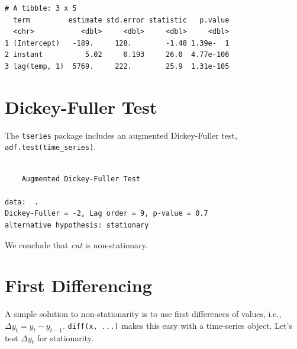 \documentclass[]{book}
\newenvironment{Shaded}{\begin{snugshade}}{\end{snugshade}}
\newcommand{\CommentTok}[1]{\textcolor[rgb]{0.56,0.35,0.01}{\textit{#1}}}
\newcommand{\KeywordTok}[1]{\textcolor[rgb]{0.13,0.29,0.53}{\textbf{#1}}}
\newcommand{\NormalTok}[1]{#1}
\newcommand{\OperatorTok}[1]{\textcolor[rgb]{0.81,0.36,0.00}{\textbf{#1}}}
\newcommand{\StringTok}[1]{\textcolor[rgb]{0.31,0.60,0.02}{#1}}
\begin{document}
\begin{verbatim}
# A tibble: 3 x 5
  term         estimate std.error statistic   p.value
  <chr>           <dbl>     <dbl>     <dbl>     <dbl>
1 (Intercept)   -189.     128.        -1.48 1.39e-  1
2 instant          5.02     0.193     26.0  4.77e-106
3 lag(temp, 1)  5769.     222.        25.9  1.31e-105
\end{verbatim}

\hypertarget{dickey-fuller-test}{%
\section{Dickey-Fuller Test}\label{dickey-fuller-test}}

The \texttt{tseries} package includes an augmented Dickey-Fuller test, \texttt{adf.test(time\_series)}.

\begin{Shaded}
\end{Shaded}

\begin{verbatim}

    Augmented Dickey-Fuller Test

data:  .
Dickey-Fuller = -2, Lag order = 9, p-value = 0.7
alternative hypothesis: stationary
\end{verbatim}

We conclude that \emph{cnt} is non-stationary.

\hypertarget{first-differencing}{%
\section{First Differencing}\label{first-differencing}}

A simple solution to non-stationarity is to use first differences of values, i.e., \(\Delta y_t=y_t-y_{t-1}\). \texttt{diff(x,\ ...)} makes this easy with a time-series object. Let's test \(\Delta y_t\) for stationarity.

\begin{Shaded}
\end{Shaded}
\end{document}
